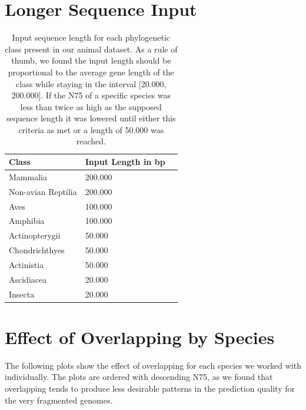 \documentclass{article}
\renewcommand{\thetable}{S\arabic{table}}
\begin{document}
\section{Longer Sequence Input}
\label{sec:longer}
\begin{table}[!h]
\label{suptab:prediction_lengths}
\centering
\begin{tabular}{@{}lll@{}}
\hline
Class & Input Length in bp\\ [0.5ex]
\hline
Mammalia & 200.000 \\
Non-avian Reptilia & 200.000 \\
Aves & 100.000 \\
Amphibia & 100.000 \\
Actinopterygii & 50.000 \\
Chondrichthyes & 50.000 \\
Actinistia & 50.000 \\
Ascidiacea & 20.000 \\
Insecta & 20.000 \\
\hline
\end{tabular}
\caption{Input sequence length for each phylogenetic class present in our animal dataset. As a rule of thumb, we found the input length should be proportional to the average gene length of the class while staying in the interval [20.000, 200.000]. If the N75 of a specific species was less than twice as high as the supposed sequence length it was lowered until either this criteria as met or a length of 50.000 was reached. }
\end{table}

\newpage
\section{Effect of Overlapping by Species}
\label{sec:overlapping}

The following plots show the effect of overlapping for each species we worked with individually. The plots are ordered with descending N75, as we found that overlapping tends to produce less desirable patterns in the prediction quality for the very fragmented genomes. 
\end{document}
